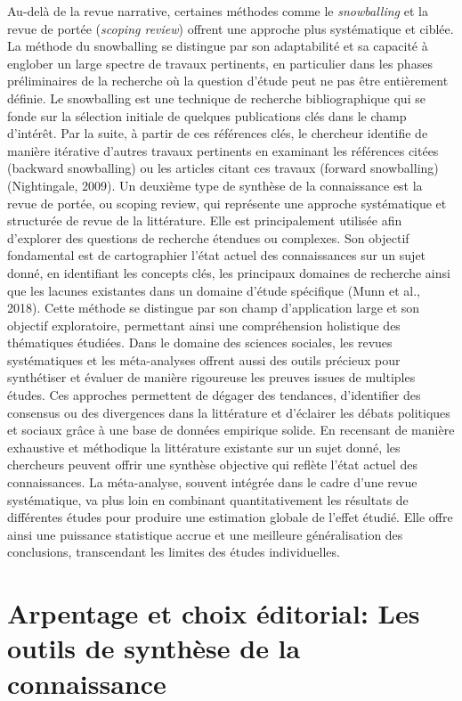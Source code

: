 \documentclass[
  letterpaper,
  DIV=11,
  numbers=noendperiod]{scrreprt}
\begin{document}
Au-delà de la revue narrative, certaines méthodes comme le
\emph{snowballing} et la revue de portée (\emph{scoping review}) offrent
une approche plus systématique et ciblée. La méthode du snowballing se
distingue par son adaptabilité et sa capacité à englober un large
spectre de travaux pertinents, en particulier dans les phases
préliminaires de la recherche où la question d'étude peut ne pas être
entièrement définie. Le snowballing est une technique de recherche
bibliographique qui se fonde sur la sélection initiale de quelques
publications clés dans le champ d'intérêt. Par la suite, à partir de ces
références clés, le chercheur identifie de manière itérative d'autres
travaux pertinents en examinant les références citées (backward
snowballing) ou les articles citant ces travaux (forward snowballing)
(Nightingale, 2009). Un deuxième type de synthèse de la connaissance est
la revue de portée, ou scoping review, qui représente une approche
systématique et structurée de revue de la littérature. Elle est
principalement utilisée afin d'explorer des questions de recherche
étendues ou complexes. Son objectif fondamental est de cartographier
l'état actuel des connaissances sur un sujet donné, en identifiant les
concepts clés, les principaux domaines de recherche ainsi que les
lacunes existantes dans un domaine d'étude spécifique (Munn et al.,
2018). Cette méthode se distingue par son champ d'application large et
son objectif exploratoire, permettant ainsi une compréhension holistique
des thématiques étudiées. Dans le domaine des sciences sociales, les
revues systématiques et les méta-analyses offrent aussi des outils
précieux pour synthétiser et évaluer de manière rigoureuse les preuves
issues de multiples études. Ces approches permettent de dégager des
tendances, d'identifier des consensus ou des divergences dans la
littérature et d'éclairer les débats politiques et sociaux grâce à une
base de données empirique solide. En recensant de manière exhaustive et
méthodique la littérature existante sur un sujet donné, les chercheurs
peuvent offrir une synthèse objective qui reflète l'état actuel des
connaissances. La méta-analyse, souvent intégrée dans le cadre d'une
revue systématique, va plus loin en combinant quantitativement les
résultats de différentes études pour produire une estimation globale de
l'effet étudié. Elle offre ainsi une puissance statistique accrue et une
meilleure généralisation des conclusions, transcendant les limites des
études individuelles.

\section{Arpentage et choix éditorial: Les outils de synthèse de la
connaissance}\label{arpentage-et-choix-uxe9ditorial-les-outils-de-synthuxe8se-de-la-connaissance}
\end{document}
